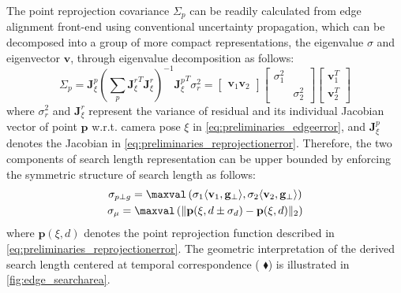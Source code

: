 The point reprojection covariance $\Sigma_{p}$ can be readily calculated from edge alignment front-end using conventional uncertainty propagation, which can be decomposed into a group of more compact representations, the eigenvalue $\sigma$ and eigenvector $\mathbf{v}$, through eigenvalue decomposition as follows:
\begin{equation} \label{eq:edge_poseuncertainty}
\Sigma_{p} =  \mathbf{J}_{\xi}^p (\sum_{p} {\mathbf{J}_{\xi}^r}^T \mathbf{J}_{\xi}^r)^{-1} {\mathbf{J}_{\xi}^p}^T \sigma_{r}^2 =
\begin{bmatrix}
\mathbf{v}_1 \mathbf{v}_2 
\end{bmatrix}
\begin{bmatrix}
\sigma_1^2 & \\
 & \sigma_2^2 
\end{bmatrix}
\begin{bmatrix}
\mathbf{v}_1^T \\
\mathbf{v}_2^T 
\end{bmatrix}
\end{equation}
where $\sigma_{r}^2$ and $\mathbf{J}_{\xi}^r$ represent the variance of residual and its individual Jacobian vector of point $\mathbf{p}$ w.r.t. camera pose $\xi$ in \ref{eq:preliminaries_edgeerror}, and $\mathbf{J}_{\xi}^p$ denotes the Jacobian in \ref{eq:preliminaries_reprojectionerror}. Therefore, the two components of search length representation can be upper bounded by enforcing the symmetric structure of search length as follows:
\begin{subequations} 
\begin{gather}
\sigma_{p \perp g}  = \maxval \left( \sigma_1 \langle \mathbf{v}_1 , \mathbf{g}_{\perp} \rangle, \sigma_2 \langle \mathbf{v}_2 , \mathbf{g}_{\perp} \rangle \right) \label{eq:edge_firstcomponent} \\
\sigma_{\mu}  = \maxval \left( \Vert \mathbf{p}(\xi,d \pm \sigma_{d})-\mathbf{p}(\xi,d) \Vert_2 \right) \label{eq:edge_secondcomponent} 
\end{gather}
\end{subequations}
where $\mathbf{p}(\xi,d)$ denotes the point reprojection function described in \ref{eq:preliminaries_reprojectionerror}. The geometric interpretation of the derived search length centered at temporal correspondence ({\color{red} $\blacklozenge$}) is illustrated in \ref{fig:edge_searcharea}.


